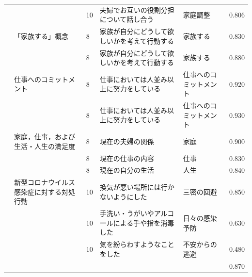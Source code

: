 \begin{landscape}
\begin{longtable}{p{2cm}p{2cm}p{2cm}p{6cm}p{2cm}p{2cm}}
                                 &                                  & 10  & 夫婦でお互いの役割分担について話し合う                                 & 家庭調整                 & 0.806   \\
                                 & 「家族する」概念                         & 8   & 家族が自分にどうして欲しいかを考えて行動する                              & 家族する                 & 0.830   \\
                                 &                                  & 8   & 家族が自分にどうして欲しいかを考えて行動する                              & 家族する                 & 0.880   \\
                                 & 仕事へのコミットメント                      & 8   & 仕事においては人並み以上に努力をしている                                & 仕事へのコミットメント          & 0.920   \\
                                 &                                  & 8   & 仕事においては人並み以上に努力をしている                                & 仕事へのコミットメント          & 0.930   \\
                                 & 家庭，仕事，および生活・人生の満足度               & 8   & 現在の夫婦の関係                                            & 家庭                   & 0.900   \\
                                 &                                  & 8   & 現在の仕事の内容                                            & 仕事                   & 0.830   \\
                                 &                                  & 8   & 現在の自分の生活                                            & 人生                   & 0.840   \\
        \citet{Koiwa202192}      & 新型コロナウイルス感染症に対する対処行動             & 10  & 換気が悪い場所には行かないようにした                                  & 三密の回避                & 0.850   \\
                                 &                                  & 10  & 手洗い・うがいやアルコールによる手や指を消毒した                            & 日々の感染予防              & 0.630   \\
                                 &                                  & 10  & 気を紛らわすようなことをした                                      & 不安からの逃避              & 0.480   \\
                                 &                                  &     &                                                     &                      & 0.870   \\

\end{longtable}
\end{landscape}
